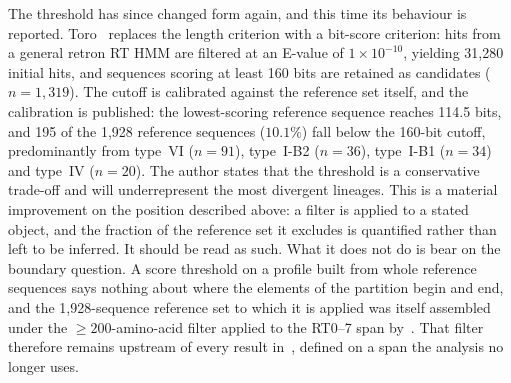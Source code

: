 The threshold has since changed form again, and this time its behaviour is
reported. Toro~\cite{toro2026} replaces the length criterion with a bit-score
criterion: hits from a general retron RT HMM are filtered at an E-value of
$1\times10^{-10}$, yielding 31{,}280 initial hits, and sequences scoring at
least 160 bits are retained as candidates ($n = 1{,}319$). The cutoff is
calibrated against the reference set itself, and the calibration is published:
the lowest-scoring reference sequence reaches 114.5 bits, and 195 of the
1{,}928 reference sequences ($10.1\%$) fall below the 160-bit cutoff,
predominantly from type~VI ($n = 91$), type~I-B2 ($n = 36$), type~I-B1 ($n =
34$) and type~IV ($n = 20$). The author states that the threshold is a
conservative trade-off and will underrepresent the most divergent lineages.
This is a material improvement on the position described above: a filter is
applied to a stated object, and the fraction of the reference set it excludes
is quantified rather than left to be inferred. It should be read as such. What
it does not do is bear on the boundary question. A score threshold on a
profile built from whole reference sequences says nothing about where the
elements of the partition begin and end, and the 1{,}928-sequence reference
set to which it is applied was itself assembled under the ${\ge}200$-amino-acid
filter applied to the RT0--7 span by~\cite{toro2019,mestre2020}. That filter
therefore remains upstream of every result in~\cite{toro2026}, defined on a
span the analysis no longer uses.




